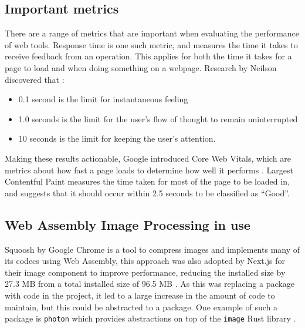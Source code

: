 \documentclass[12pt,a4paper]{article}
\begin{document}

\subsection{Important metrics}

There are a range of metrics that are important when evaluating the performance of web tools. Response time is one such metric, and measures the time it takes to receive feedback from an operation. This applies for both the time it takes for a page to load and when doing something on a webpage. Research by Neilson discovered that \cite{nielsen1994usability}:
\begin{itemize}
    \item 0.1 second is the limit for instantaneous feeling
    \item 1.0 seconds is the limit for the user's flow of thought to remain uninterrupted
    \item 10 seconds is the limit for keeping the user's attention.
\end{itemize}

Making these results actionable, Google introduced Core Web Vitals, which are metrics about how fast a page loads to determine how well it performs \cite{webvitals}. Largest Contentful Paint measures the time taken for most of the page to be loaded in, and suggests that it should occur within 2.5 seconds to be classified as “Good”.




\subsection{Web Assembly Image Processing in use}

Squoosh by Google Chrome is a tool to compress images and implements many of its codecs using Web Assembly, this approach was also adopted by Next.js for their image component to improve performance, reducing the installed size by 27.3 MB from a total installed size of 96.5 MB \cite{nextjs}. As this was replacing a package with code in the project, it led to a large increase in the amount of code to maintain, but this could be abstracted to a package. One example of such a package is \texttt{photon} which provides abstractions on top of the \texttt{image} Rust library \cite{photon}.

\end{document}
